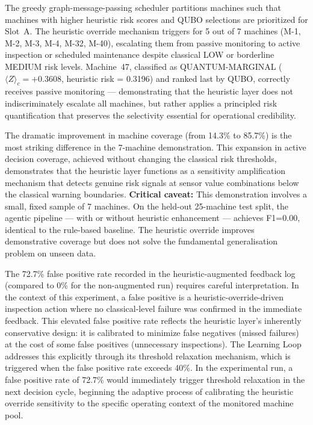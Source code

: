 The greedy graph-message-passing scheduler partitions machines such that machines with higher heuristic risk scores and QUBO selections are prioritized for Slot~A. The heuristic override mechanism triggers for 5 out of 7 machines (M-1, M-2, M-3, M-4, M-32, M-40), escalating them from passive monitoring to active inspection or scheduled maintenance despite classical LOW or borderline MEDIUM risk levels. Machine~47, classified as QUANTUM-MARGINAL ($\langle Z \rangle_c = +0.3608$, heuristic risk = 0.3196) and ranked last by QUBO, correctly receives passive monitoring --- demonstrating that the heuristic layer does not indiscriminately escalate all machines, but rather applies a principled risk quantification that preserves the selectivity essential for operational credibility.

The dramatic improvement in machine coverage (from 14.3\% to 85.7\%) is the most striking difference in the 7-machine demonstration. This expansion in active decision coverage, achieved without changing the classical risk thresholds, demonstrates that the heuristic layer functions as a sensitivity amplification mechanism that detects genuine risk signals at sensor value combinations below the classical warning boundaries. \textbf{Critical caveat:} This demonstration involves a small, fixed sample of 7 machines. On the held-out 25-machine test split, the agentic pipeline --- with or without heuristic enhancement --- achieves F1=0.00, identical to the rule-based baseline. The heuristic override improves demonstrative coverage but does not solve the fundamental generalisation problem on unseen data.

The 72.7\% false positive rate recorded in the heuristic-augmented feedback log (compared to 0\% for the non-augmented run) requires careful interpretation. In the context of this experiment, a false positive is a heuristic-override-driven inspection action where no classical-level failure was confirmed in the immediate feedback. This elevated false positive rate reflects the heuristic layer's inherently conservative design: it is calibrated to minimize false negatives (missed failures) at the cost of some false positives (unnecessary inspections). The Learning Loop addresses this explicitly through its threshold relaxation mechanism, which is triggered when the false positive rate exceeds 40\%. In the experimental run, a false positive rate of 72.7\% would immediately trigger threshold relaxation in the next decision cycle, beginning the adaptive process of calibrating the heuristic override sensitivity to the specific operating context of the monitored machine pool.

